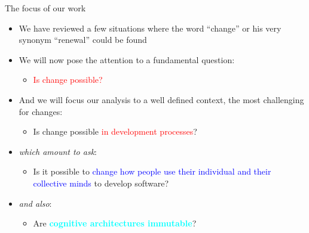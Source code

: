 \documentclass{beamer}
\begin{document}
\begin{frame}
{\centerline{The focus of our work}}


\begin{itemize}
\item We have reviewed a few situations where the word ``change'' or his very synonym ``renewal'' could be found
\item We will now pose the attention to a fundamental question:
\begin{itemize}
\item \textcolor{red}{Is change possible?}
\end{itemize} 
\item And we will focus our analysis to a well defined context, the most challenging for changes:
\begin{itemize}
\item Is change possible \textcolor{red}{in development processes}?
\end{itemize} 
\item \textit{which amount to ask}:
\begin{itemize}
\item Is it possible to \textcolor{blue}{change how people use their individual and their collective minds} to develop software?
\end{itemize} 
\item \textit{and also}:
\begin{itemize}
\item Are \textcolor{cyan}{\textbf{cognitive architectures immutable}}?
\end{itemize} 
\end{itemize} 

\end{frame}
\end{document}
